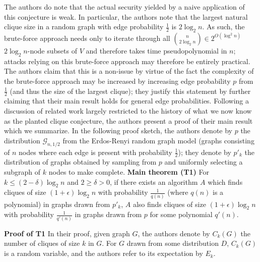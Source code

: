 \documentclass{article}
\theoremstyle{definition}
\begin{document}
The authors do note that the actual security yielded by a naive application of this 
conjecture is weak.  In particular, the authors note that the largest natural clique 
size in a random graph with edge probability $\frac{1}{2}$ is $2 \log_2{n}$.  As such,
the brute-force approach needs only to iterate through all 
$\binom{n}{2 \log_2{n}} \in 2^{O(\log^2{n})}$ 
$2\log_2{n}$-node subsets of $V$ and therefore takes time pseudopolynomial in $n$; attacks 
relying on this brute-force approach may therefore be entirely practical.  The authors claim 
that this is a non-issue by virtue of the fact the complexity of the brute-force approach may 
be increased by increasing edge probability $p$ from $\frac{1}{2}$ (and thus the 
size of the largest clique); they justify this statement by further claiming that their main 
result holds for general edge probabilities.
\newline\newline
Following a discussion of related work largely restricted to the history of what we 
now know as the planted clique conjecture, the authors present a proof of their main result
which we summarize.  In the following proof sketch, the authors denote by $p$ the 
distribution $\mathcal{G}_{n,1/2}$ from the Erdos-Renyi random graph model (graphs 
consisting of $n$ nodes where each edge is present with probability $\frac{1}{2}$); they 
denote by $p'_k$ the distribution of graphs obtained by sampling from $p$ and uniformly 
selecting a subgraph of $k$ nodes to make complete.
\newline\newline
\noindent \textbf{Main theorem (T1) } For $k \leq (2-\delta) \log_2{n}$ and $2\geq \delta  > 0$,
if there exists an algorithm $A$ which finds cliques of size $(1+\epsilon)\log_2{n}$ with 
probability $\frac{1}{q(n)}$ (where $q(n)$ is a polynomial) in graphs drawn from 
$p'_k$, $A$ also finds cliques of size $(1+\epsilon)\log_2{n}$ with probability 
$\frac{1}{q'(n)}$ in graphs drawn from $p$ for some polynomial $q'(n)$.

\noindent \textbf{Proof of T1 } In their proof, given graph $G$, the authors denote by $C_k(G)$ the number of 
cliques of size $k$ in $G$.  For $G$ drawn from some distribution $D$, 
$C_k(G)$ is a random variable, and the authors refer to its expectation by $E_k$.
\end{document}
